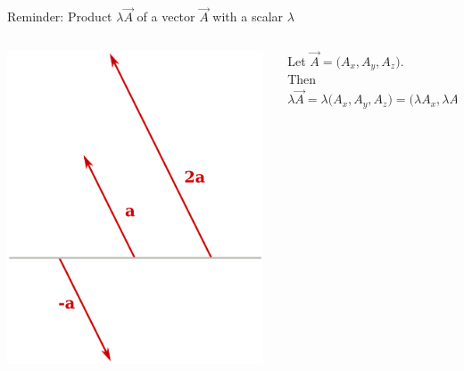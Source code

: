 {\begin{frame}{Reminder: Product $\lambda \vec{A}$ of a vector $\vec{A}$ with a scalar $\lambda$}
\begin{columns}
  \begin{column}{0.45\textwidth}
   \begin{center}
     \includegraphics[width=0.98\textwidth]{./images/schematics/vector_multiplication_with_scalar_1.png}\\
   \end{center}
  \end{column}
  \begin{column}{0.55\textwidth}
     Let $\vec{A} = \Big( A_x, A_y, A_z \Big)$.\\
     \vspace{0.3cm}
     Then
     \begin{equation*}
       \lambda \vec{A} = \lambda \Big( A_x, A_y, A_z \Big) =
         \Big(\lambda A_x, \lambda A_y, \lambda A_z \Big)
     \end{equation*}
  \end{column}
\end{columns}

\end{frame}

}
